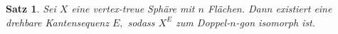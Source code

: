 \documentclass[12pt,titlepage,twoside,cleardoublepage]{article}
\theoremstyle{nummermitklammern}
\newtheorem{satz}[temp]{Satz}
\newtheorem{satz}[zahl]{Satz}
\numberwithin{equation}{section}
\begin{document}
\begin{comment}
Man muss die Kantensequenz $E$ in $Z$ nun so in eine Kantensequenz $E'$ in $X$ abändern, dass Anhängen des Tetraeders und Anwenden einer Kantendrehung vertauschbar sind.
\[
bild 
\] 
Sei dafür die Sphäre $X^0:=X$ und $X^i$ und die Kantensequenz $E_i=(e_1,\ldots,e_l)$ in $X$ für $0\leq i \leq m$ schon konstruiert. Sei $F$ die Fläche, die beim Entfernen des Tetraeders den Tetraeder ersetzt. Man führt folgende Fallunterscheidung durch
\begin{itemize}
\item Falls die Kante $e_i$ der Kantensequenz $E$ nicht zu F inzident ist, so wähle $X^{i+1}:={(X^i)}^{e_i}$ und $E_{i+1}:=(e_1,\ldots,e_l,e_i)$. Damit ist 
\[
T(Z^{(e_1,\ldots,e_l,e_i)})^F\cong X^{E_{i+1}}
\]
und für alle Ecken $V\in X^{E_{i+1}}$ gilt $deg_{X^{E_{i+1}}}(V)\geq deg_S(V)\geq 3,$ wobei $S=T(Y^{(e_1,\ldots,e_i)})^F$ ist.
\item Falls die Kante $e_i$ der Kantensequenz $E$ zu F inzident ist, muss man Kantendrehungen anwenden, die die oben erwähnte Vertauschbarkeit liefern. 
Seien $F_1,F_2,F_3,$ die zu $V^*$ inzidenten Flächen. Sei ohne Einschränkung $e_i<F_1$ und $e$ die Kante, die $\vert {(X^i)^{e_i}}_2(e)\cup \{F_1,F_2,F_3\}\vert =1$ erfüllt.
\[
bild
\]

Dann definiert man $X^{i+1}:={X^i}^{(e_i,e)}$ und $E^{i+1}:=(e'_1,\ldots,e_l',e_i,e').$ Dann ist ebenfalls
\[
T(Y^{(e_1,\ldots,e_i)})^F\cong X^{E_{i+1}}
\] 
\end{itemize}
Nach endlich vielen Schritten erhält man also eine Kantensequenz $E^*$ in $X$ sodass 
\[X^{E^*}\cong T(Z^E)^F \cong T((n-1)^2)^F
\]ist. 
Sei $e$ die Kante, die die beiden Ecken mit Grad 5 verbindet. Dann ist $(X^{E^*})^e\cong (n)^2.$ Für alle $V\in X_0 \setminus \{V^*\}$ gilt 
\[
deg_{X^E_{i}}(V)=geq deg_{T(Z^{(e_1,\ldots,e_i)})}(V)\geq 3.
\] 
und Anwenden der beiden Kantendrehungen im zweitem Fall sorgen, dafür das $deg(V^*)$ erst um 1 erhöht und dann um 1 verringert wird. Damit ist die Aussage gezeigt.
\end{proof}



Sei $X$ eine vertex-treue Sphäre und $E=(e_1,\ldots ,e_n)$ eine Kantensequenz in $X$. Man nennt $E$ eine vertex-treue Kantensequenz, falls für alle $1\leq i \leq n$ die Sphäre $X^{(e_1,\ldots,e_i)}$ vertex-treu ist.
\end{definition}
\end{comment}
\begin{satz}\label{3eck}
Sei $X$ eine vertex-treue Sphäre mit $n$ Flächen. Dann existiert eine drehbare Kantensequenz $E,$ sodass $X^E$ zum Doppel-$n$-gon isomorph ist. 
\end{satz}
\end{document}
